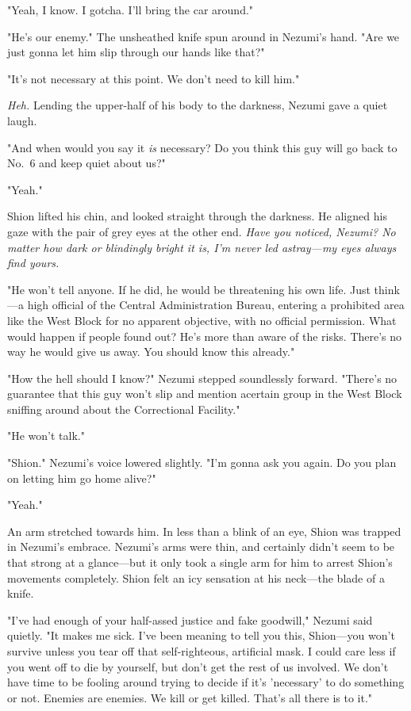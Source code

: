 "Yeah, I know. I gotcha. I'll bring the car around."

"He's our enemy." The unsheathed knife spun around in Nezumi's hand.
"Are we just gonna let him slip through our hands like that?"

"It's not necessary at this point. We don't need to kill him."

\emph{Heh.} Lending the upper-half of his body to the darkness, Nezumi gave a
quiet laugh.

"And when would you say it \emph{is} necessary? Do you think this guy will go
back to No.~6 and keep quiet about us?"

"Yeah."

Shion lifted his chin, and looked straight through the darkness. He
aligned his gaze with the pair of grey eyes at the other end. \emph{Have you
noticed, Nezumi? No matter how dark or blindingly bright it is, I'm
never led astray---my eyes always find yours.}

"He won't tell anyone. If he did, he would be threatening his own life.
Just think---a high official of the Central Administration Bureau,
entering a prohibited area like the West Block for no apparent
objective, with no official permission. What would happen if people
found out? He's more than aware of the risks. There's no way he would
give us away. You should know this already."

"How the hell should I know?" Nezumi stepped soundlessly forward.
"There's no guarantee that this guy won't slip and mention a\el certain
group in the West Block sniffing around about the Correctional
Facility."

"He won't talk."

"Shion." Nezumi's voice lowered slightly. "I'm gonna ask you again. Do
you plan on letting him go home alive?"

"Yeah."

An arm stretched towards him. In less than a blink of an eye, Shion was
trapped in Nezumi's embrace. Nezumi's arms were thin, and certainly
didn't seem to be that strong at a glance---but it only took a single arm
for him to arrest Shion's movements completely. Shion felt an icy
sensation at his neck---the blade of a knife.

"I've had enough of your half-assed justice and fake goodwill," Nezumi
said quietly. "It makes me sick. I've been meaning to tell you this,
Shion---you won't survive unless you tear off that self-righteous,
artificial mask. I could care less if you went off to die by yourself,
but don't get the rest of us involved. We don't have time to be fooling
around trying to decide if it's 'necessary' to do something or not.
Enemies are enemies. We kill or get killed. That's all there is to it."

